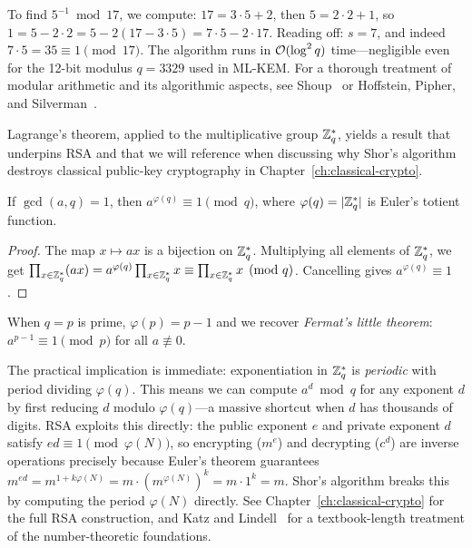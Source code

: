\begin{example}
\label{ex:extended-euclid}
To find $5^{-1} \bmod 17$, we compute: $17 = 3 \cdot 5 + 2$, then $5 = 2 \cdot 2 + 1$, so $1 = 5 - 2 \cdot 2 = 5 - 2(17 - 3 \cdot 5) = 7 \cdot 5 - 2 \cdot 17$.  Reading off: $s = 7$, and indeed $7 \cdot 5 = 35 \equiv 1 \pmod{17}$.  The algorithm runs in $\mathcal{O}(\log^2 q)$ time---negligible even for the 12-bit modulus $q = 3329$ used in ML-KEM.  For a thorough treatment of modular arithmetic and its algorithmic aspects, see Shoup~\cite{Shoup2009} or Hoffstein, Pipher, and Silverman~\cite{HPS2014}.
\end{example}

Lagrange's theorem, applied to the multiplicative group $\mathbb{Z}_q^*$, yields a result that underpins RSA and that we will reference when discussing why Shor's algorithm destroys classical public-key cryptography in Chapter~\ref{ch:classical-crypto}.

\begin{theorem}
\label{thm:euler}
If $\gcd(a, q) = 1$, then $a^{\varphi(q)} \equiv 1 \pmod{q}$, where $\varphi(q) = |\mathbb{Z}_q^*|$ is Euler's totient function.
\end{theorem}

\begin{proof}
The map $x \mapsto ax$ is a bijection on $\mathbb{Z}_q^*$.  Multiplying all elements of $\mathbb{Z}_q^*$, we get $\prod_{x \in \mathbb{Z}_q^*} (ax) = a^{\varphi(q)} \prod_{x \in \mathbb{Z}_q^*} x \equiv \prod_{x \in \mathbb{Z}_q^*} x \pmod{q}$.  Cancelling gives $a^{\varphi(q)} \equiv 1$.
\end{proof}

When $q = p$ is prime, $\varphi(p) = p - 1$ and we recover \emph{Fermat's little theorem}: $a^{p-1} \equiv 1 \pmod{p}$ for all $a \not\equiv 0$.

The practical implication is immediate: exponentiation in $\mathbb{Z}_q^*$ is \emph{periodic} with period dividing $\varphi(q)$.  This means we can compute $a^d \bmod q$ for any exponent $d$ by first reducing $d$ modulo $\varphi(q)$---a massive shortcut when $d$ has thousands of digits.  RSA exploits this directly: the public exponent $e$ and private exponent $d$ satisfy $ed \equiv 1 \pmod{\varphi(N)}$, so encrypting ($m^e$) and decrypting ($c^d$) are inverse operations precisely because Euler's theorem guarantees $m^{ed} = m^{1 + k\varphi(N)} = m \cdot (m^{\varphi(N)})^k = m \cdot 1^k = m$.  Shor's algorithm breaks this by computing the period $\varphi(N)$ directly.  See Chapter~\ref{ch:classical-crypto} for the full RSA construction, and Katz and Lindell~\cite{KatzLindell2020} for a textbook-length treatment of the number-theoretic foundations.


